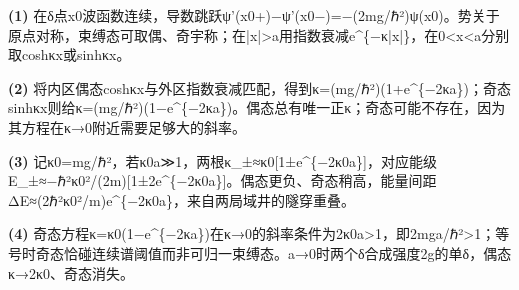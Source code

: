 \par\noindent\textbf{(1)} 在δ点x0波函数连续，导数跳跃ψ'(x0+)−ψ'(x0−)=−(2mg/ℏ²)ψ(x0)。势关于原点对称，束缚态可取偶、奇宇称；在|x|>a用指数衰减e\textasciicircum{}\{−κ|x|\}，在0<x<a分别取coshκx或sinhκx。
\par\noindent\textbf{(2)} 将内区偶态coshκx与外区指数衰减匹配，得到κ=(mg/ℏ²)(1+e\textasciicircum{}\{−2κa\})；奇态sinhκx则给κ=(mg/ℏ²)(1−e\textasciicircum{}\{−2κa\})。偶态总有唯一正κ；奇态可能不存在，因为其方程在κ→0附近需要足够大的斜率。
\par\noindent\textbf{(3)} 记κ0=mg/ℏ²，若κ0a≫1，两根κ\_±≈κ0[1±e\textasciicircum{}\{−2κ0a\}]，对应能级E\_±≈−ℏ²κ0²/(2m)[1±2e\textasciicircum{}\{−2κ0a\}]。偶态更负、奇态稍高，能量间距ΔE≈(2ℏ²κ0²/m)e\textasciicircum{}\{−2κ0a\}，来自两局域井的隧穿重叠。
\par\noindent\textbf{(4)} 奇态方程κ=κ0(1−e\textasciicircum{}\{−2κa\})在κ→0的斜率条件为2κ0a>1，即2mga/ℏ²>1；等号时奇态恰碰连续谱阈值而非可归一束缚态。a→0时两个δ合成强度2g的单δ，偶态κ→2κ0、奇态消失。
